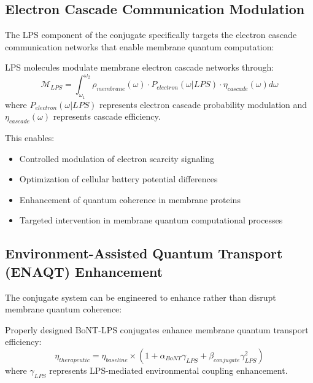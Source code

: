 \documentclass[11pt,a4paper]{article}
\begin{document}
\subsection{Electron Cascade Communication Modulation}

The LPS component of the conjugate specifically targets the electron cascade communication networks that enable membrane quantum computation:

\begin{definition}
LPS molecules modulate membrane electron cascade networks through:
\begin{equation}
\mathcal{M}_{LPS} = \int_{\omega_1}^{\omega_2} \rho_{membrane}(\omega) \cdot P_{electron}(\omega | LPS) \cdot \eta_{cascade}(\omega) d\omega
\end{equation}
where $P_{electron}(\omega | LPS)$ represents electron cascade probability modulation and $\eta_{cascade}(\omega)$ represents cascade efficiency.
\end{definition}

This enables:
\begin{itemize}
\item Controlled modulation of electron scarcity signaling
\item Optimization of cellular battery potential differences
\item Enhancement of quantum coherence in membrane proteins
\item Targeted intervention in membrane quantum computational processes
\end{itemize}

\subsection{Environment-Assisted Quantum Transport (ENAQT) Enhancement}

The conjugate system can be engineered to enhance rather than disrupt membrane quantum coherence:

\begin{theorem}
Properly designed BoNT-LPS conjugates enhance membrane quantum transport efficiency:
\begin{equation}
\eta_{therapeutic} = \eta_{baseline} \times (1 + \alpha_{BoNT} \gamma_{LPS} + \beta_{conjugate} \gamma_{LPS}^2)
\end{equation}
where $\gamma_{LPS}$ represents LPS-mediated environmental coupling enhancement.
\end{theorem}
\end{document}
